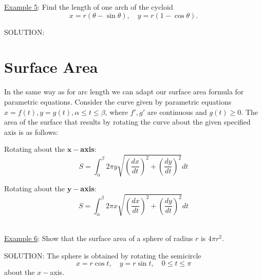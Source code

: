 \documentclass[paper=a4, fontsize=11pt]{scrartcl} %
\numberwithin{equation}{section} %
\numberwithin{figure}{section} %
\numberwithin{table}{section} %
\newcommand{\ds}{\displaystyle}
\begin{document}
\underline{Example 5}: Find the length of one arch of the cycloid
\[x=r(\theta - \sin\theta), \quad y=r(1-\cos\theta).\]
\indent

SOLUTION:\\

\vspace{3.5in}
\newpage
\section*{Surface Area}
In the same way as for arc length we can adapt our surface area formula for parametric equations. Consider the curve given by parametric equations $x=f(t), y=g(t), \alpha\leq t \leq \beta$, where $f',g'$ are continuous and $g(t)\geq 0$. The area of the surface that results by rotating the curve about the given specified axis is as follows:\\
\indent

Rotating about the $\mathbf{x-}$\textbf{axis}:
\[\boxed{\quad S = \ds\int_\alpha^\beta 2\pi y \ds\sqrt{\left(\ds\frac{dx}{dt}\right)^2 + \left(\ds\frac{dy}{dt}\right)^2}dt \quad }\]

Rotating about the $\mathbf{y-}$\textbf{axis}:
\[\boxed{\quad S = \ds\int_\alpha^\beta 2\pi x \ds\sqrt{\left(\ds\frac{dx}{dt}\right)^2 + \left(\ds\frac{dy}{dt}\right)^2}dt \quad }\]
\indent\\
\indent

\underline{Example 6}: Show that the surface area of a sphere of radius $r$ is $4\pi r^2$.\\
\indent

SOLUTION: The sphere is obtained by rotating the semicircle
\[x=r\cos t, \quad y=r\sin t, \quad 0 \leq t \leq \pi\]
about the $x-$axis.\\

\vspace{3in}

 



\end{document}
